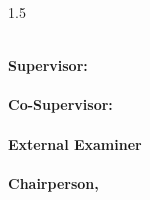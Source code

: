 \vspace{1.8cm}

\noindent
\begin{minipage}[t]{\textwidth}
\setlength{\parindent}{0pt}
\begin{spacing}{1.5}

\fypsigline[7cm]\\
\textbf{Supervisor:} \fypSupervisor\\[1.4cm]

\fypsigline[7cm]\\
\textbf{Co-Supervisor:} \fypCoSupervisor\\[1.4cm]

\fypsigline[7cm]\\
\textbf{External Examiner}\\[1.4cm]

\fypsigline[7cm]\\
\textbf{Chairperson, \fypDepartment}

\end{spacing}
\end{minipage}

\clearpage
